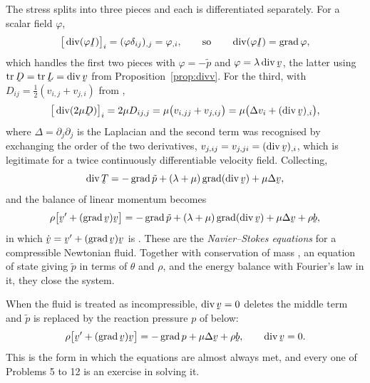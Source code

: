 The stress splits into three pieces and each is differentiated
separately. For a scalar field $\varphi$,
\[
   \big[\dvg(\varphi\I)\big]_{i}=(\varphi\dd_{ij})_{,j}=\varphi_{,i},
   \qquad\text{so}\qquad
   \dvg(\varphi\I)=\grad\varphi ,
\]
which handles the first two pieces with $\varphi=-\tilde p$ and
$\varphi=\lambda\dvg\bv$, the latter using $\tr\bD=\tr\bL=\dvg\bv$ from
Proposition~\ref{prop:divv}. For the third, with
$D_{ij}=\tfrac12(v_{i,j}+v_{j,i})$ from ,
\[
   \big[\dvg(2\mu\bD)\big]_{i}=2\mu D_{ij,j}
   =\mu\big(v_{i,jj}+v_{j,ij}\big)
   =\mu\big(\Delta v_{i}+(\dvg\bv)_{,i}\big),
\]
where $\Delta=\partial_{j}\partial_{j}$ is the Laplacian and the second
term was recognised by exchanging the order of the two derivatives,
$v_{j,ij}=v_{j,ji}=(\dvg\bv)_{,i}$, which is legitimate for a twice
continuously differentiable velocity field. Collecting,
\[
   \dvg\bT=-\grad\tilde p+(\lambda+\mu)\grad(\dvg\bv)+\mu\Delta\bv ,
\]
and the balance of linear momentum becomes
\[
   \rho\big[\bv'+(\grad\bv)\bv\big]
   =-\grad\tilde p+(\lambda+\mu)\grad(\dvg\bv)+\mu\Delta\bv+\rho\bb ,
\]
in which $\dot\bv=\bv'+(\grad\bv)\bv$ is . These are the
\emph{Navier--Stokes equations} for a compressible Newtonian fluid.
Together with conservation of mass , an equation of state
giving $\tilde p$ in terms of $\theta$ and $\rho$, and the energy
balance  with Fourier's law in it, they close the system.

When the fluid is treated as incompressible, $\dvg\bv=0$ deletes the
middle term and $\tilde p$ is replaced by the reaction pressure $p$ of
 below:
\[
   \rho\big[\bv'+(\grad\bv)\bv\big]=-\grad p+\mu\Delta\bv+\rho\bb ,
   \qquad \dvg\bv=0 .
\]
This is the form in which the equations are almost always met, and every
one of Problems 5 to 12 is an exercise in solving it.


